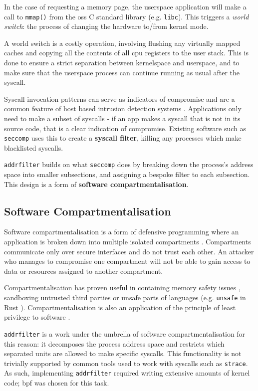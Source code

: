 In the case of requesting a memory page, the userspace application will make a
call to \texttt{mmap()} from the \acp{os} C standard library (e.g. \texttt{libc}).
This triggers a \textit{world switch}: the process of changing the hardware
to/from kernel mode.

A world switch is a costly operation, involving flushing any virtually mapped
caches and copying all the contents of all \ac{cpu} registers to the user stack. This
is done to ensure a strict separation between kernelspace and userspace, and to
make sure that the userspace process can continue running as usual after the
syscall.

Syscall invocation patterns can serve as indicators of compromise
and are a common feature of host based intrusion detection systems \cite{10.1145/3214304}. 
Applications only need to make a subset of syscalls
- if an app makes a syscall that is not in its source code, that is a clear
indication of compromise. Existing software such as \texttt{seccomp} uses this
to create a \textbf{syscall filter}, killing any processes which make
blacklisted syscalls. 

\texttt{addrfilter} builds on what \texttt{seccomp} does by breaking down the
process's address space into smaller subsections, and assigning a bespoke filter
to each subsection. This design is a form of \textbf{software
compartmentalisation}. 

\subsection{Software Compartmentalisation}

Software compartmentalisation is a form of defensive programming where an
application is broken down into multiple isolated compartments \cite{SOK}. Compartments
communicate only over secure interfaces and do not trust each other. An attacker
who manages to compromise one compartment will not be able to gain access to
data or resources assigned to another compartment. 

Compartmentalisation has proven useful in containing memory safety issues
\cite{CONFFUZZ},
sandboxing untrusted third parties \cite{ANDROID_SOK} or unsafe parts of
languages \cite{MPK} (e.g.
\texttt{unsafe} in Rust \cite{rustbook_unsafe}). Compartmentalisation is also an
application of the principle of least privilege to software \cite{PRIVMAN}.

\texttt{addrfilter} is a work under the umbrella of software
compartmentalisation for this reason: it decomposes the process address space
and restricts which separated units are allowed to make specific syscalls.
This functionality is not trivially supported by common tools used to work with
syscalls such as \texttt{strace}. As such, implementing \texttt{addrfilter}
required writing extensive amounts of kernel code; \ac{bpf} was chosen for this
task.

